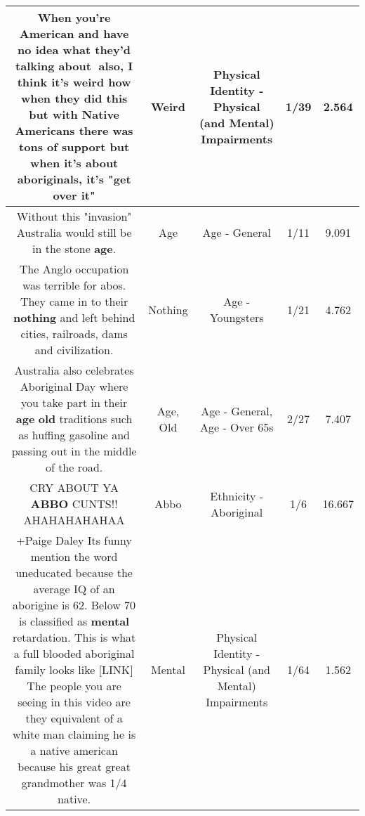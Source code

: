 \documentclass[11pt]{article}
\newlength\mylength
\begin{document}
\begin{center}
\begin{longtable}{|C{.65\mylength}|C{.30\mylength}|C{.12\mylength}|C{.12\mylength}|C{.12\mylength}|}
  \small When you're American and have no idea what they'd talking about💁 also, I think it's \textbf{weird} how when they did this but with Native Americans there was tons of support but when it's about aboriginals, it's "get over it"\normalsize   & Weird & Physical Identity - Physical (and Mental) Impairments & 1/39 & 2.564 \\  \hline
  \small Without this "invasion" Australia would still be in the stone \textbf{age}.\normalsize   & Age & Age - General & 1/11 & 9.091 \\  \hline
  \small The Anglo occupation was terrible for abos. They came in to their \textbf{nothing} and left behind cities, railroads, dams and civilization.\normalsize   & Nothing & Age - Youngsters & 1/21 & 4.762 \\  \hline
  \small Australia also celebrates Aboriginal Day where you take part in their \textbf{age} \textbf{old} traditions such as huffing gasoline and passing out in the middle of the road.\normalsize   & Age, Old & Age - General, Age - Over 65s & 2/27 & 7.407 \\  \hline
  \small CRY ABOUT YA \textbf{ABBO} CUNTS!! AHAHAHAHAHAA\normalsize   & Abbo & Ethnicity - Aboriginal & 1/6 & 16.667 \\  \hline
  \small +Paige Daley Its funny mention the word uneducated because the average IQ of an aborigine is 62. Below 70 is classified as \textbf{mental} retardation. This is what a full blooded aboriginal family looks like  [LINK]  The people you are seeing in this video are they equivalent of a white man claiming he is a native american because his great great grandmother was 1/4 native.\normalsize   & Mental & Physical Identity - Physical (and Mental) Impairments & 1/64 & 1.562 \\  \hline

\end{longtable}
\end{center}
\end{document}
